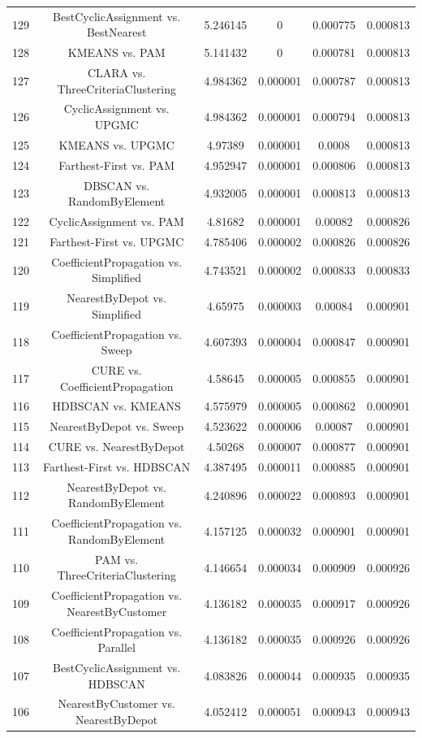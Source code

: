 \documentclass[a4paper,10pt]{article}
\begin{document}
\begin{landscape}
\begin{table}[!htp]
\begin{tabular}{cccccc}
129&BestCyclicAssignment vs. BestNearest&5.246145&0&0.000775&0.000813\\
128&KMEANS vs. PAM&5.141432&0&0.000781&0.000813\\
127&CLARA vs. ThreeCriteriaClustering&4.984362&0.000001&0.000787&0.000813\\
126&CyclicAssignment vs. UPGMC&4.984362&0.000001&0.000794&0.000813\\
125&KMEANS vs. UPGMC&4.97389&0.000001&0.0008&0.000813\\
124&Farthest-First vs. PAM&4.952947&0.000001&0.000806&0.000813\\
123&DBSCAN vs. RandomByElement&4.932005&0.000001&0.000813&0.000813\\
122&CyclicAssignment vs. PAM&4.81682&0.000001&0.00082&0.000826\\
121&Farthest-First vs. UPGMC&4.785406&0.000002&0.000826&0.000826\\
120&CoefficientPropagation vs. Simplified&4.743521&0.000002&0.000833&0.000833\\
119&NearestByDepot vs. Simplified&4.65975&0.000003&0.00084&0.000901\\
118&CoefficientPropagation vs. Sweep&4.607393&0.000004&0.000847&0.000901\\
117&CURE vs. CoefficientPropagation&4.58645&0.000005&0.000855&0.000901\\
116&HDBSCAN vs. KMEANS&4.575979&0.000005&0.000862&0.000901\\
115&NearestByDepot vs. Sweep&4.523622&0.000006&0.00087&0.000901\\
114&CURE vs. NearestByDepot&4.50268&0.000007&0.000877&0.000901\\
113&Farthest-First vs. HDBSCAN&4.387495&0.000011&0.000885&0.000901\\
112&NearestByDepot vs. RandomByElement&4.240896&0.000022&0.000893&0.000901\\
111&CoefficientPropagation vs. RandomByElement&4.157125&0.000032&0.000901&0.000901\\
110&PAM vs. ThreeCriteriaClustering&4.146654&0.000034&0.000909&0.000926\\
109&CoefficientPropagation vs. NearestByCustomer&4.136182&0.000035&0.000917&0.000926\\
108&CoefficientPropagation vs. Parallel&4.136182&0.000035&0.000926&0.000926\\
107&BestCyclicAssignment vs. HDBSCAN&4.083826&0.000044&0.000935&0.000935\\
106&NearestByCustomer vs. NearestByDepot&4.052412&0.000051&0.000943&0.000943\\

\end{tabular}
\end{table}
\end{landscape}
\end{document}
